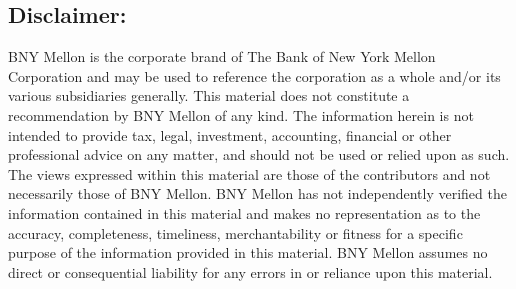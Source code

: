 {\small
\subsection*{Disclaimer:} BNY Mellon is the corporate brand of The Bank of New York Mellon Corporation and may be used to reference the corporation as a whole and/or its various subsidiaries generally.  This material does not constitute a recommendation by BNY Mellon of any kind.  The information herein is not intended to provide tax, legal, investment, accounting, financial or other professional advice on any matter, and should not be used or relied upon as such.  The views expressed within this material are those of the contributors and not necessarily those of BNY Mellon.  BNY Mellon has not independently verified the information contained in this material and makes no representation as to the accuracy, completeness, timeliness, merchantability or fitness for a specific purpose of the information provided in this material.  BNY Mellon assumes no direct or consequential liability for any errors in or reliance upon this material.}

